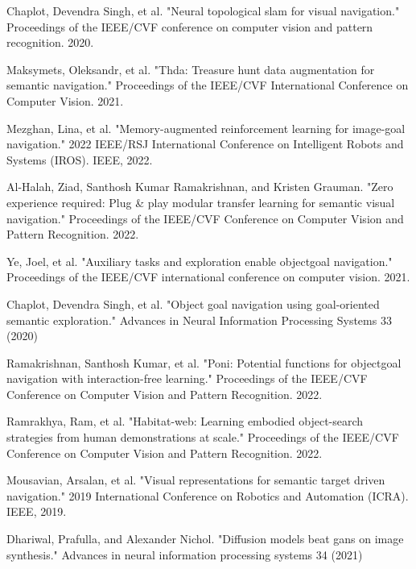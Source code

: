 \begin{thebibliography}{99}

 Chaplot, Devendra Singh, et al. "Neural topological slam for visual navigation." Proceedings of the IEEE/CVF conference on computer vision and pattern recognition. 2020.

 Maksymets, Oleksandr, et al. "Thda: Treasure hunt data augmentation for semantic navigation." Proceedings of the IEEE/CVF International Conference on Computer Vision. 2021.

 Mezghan, Lina, et al. "Memory-augmented reinforcement learning for image-goal navigation." 2022 IEEE/RSJ International Conference on Intelligent Robots and Systems (IROS). IEEE, 2022.

 Al-Halah, Ziad, Santhosh Kumar Ramakrishnan, and Kristen Grauman. "Zero experience required: Plug \& play modular transfer learning for semantic visual navigation." Proceedings of the IEEE/CVF Conference on Computer Vision and Pattern Recognition. 2022.

 Ye, Joel, et al. "Auxiliary tasks and exploration enable objectgoal navigation." Proceedings of the IEEE/CVF international conference on computer vision. 2021.

 Chaplot, Devendra Singh, et al. "Object goal navigation using goal-oriented semantic exploration." Advances in Neural Information Processing Systems 33 (2020)

 Ramakrishnan, Santhosh Kumar, et al. "Poni: Potential functions for objectgoal navigation with interaction-free learning." Proceedings of the IEEE/CVF Conference on Computer Vision and Pattern Recognition. 2022.

 Ramrakhya, Ram, et al. "Habitat-web: Learning embodied object-search strategies from human demonstrations at scale." Proceedings of the IEEE/CVF Conference on Computer Vision and Pattern Recognition. 2022.

 Mousavian, Arsalan, et al. "Visual representations for semantic target driven navigation." 2019 International Conference on Robotics and Automation (ICRA). IEEE, 2019.

 Dhariwal, Prafulla, and Alexander Nichol. "Diffusion models beat gans on image synthesis." Advances in neural information processing systems 34 (2021)


\end{thebibliography}
